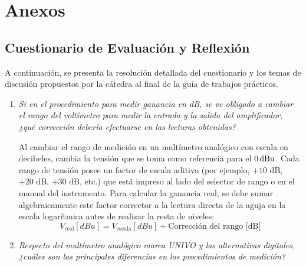 \chapter{Anexos}
\label{chap:anexos}

\section{Cuestionario de Evaluación y Reflexión}

A continuación, se presenta la resolución detallada del cuestionario y los temas de discusión propuestos por la cátedra al final de la guía de trabajos prácticos.

\begin{enumerate}[label=\alph*)]
    \item \textit{Si en el procedimiento para medir ganancia en dB, se ve obligado a cambiar el rango del voltímetro para medir la entrada y la salida del amplificador, ¿qué corrección debería efectuarse en las lecturas obtenidas?}
    
    Al cambiar el rango de medición en un multímetro analógico con escala en decibeles, cambia la tensión que se toma como referencia para el $0\,\mathrm{dBu}$. Cada rango de tensión posee un factor de escala aditivo (por ejemplo, $+10\text{ dB}$, $+20\text{ dB}$, $+30\text{ dB}$, etc.) que está impreso al lado del selector de rango o en el manual del instrumento.
    Para calcular la ganancia real, se debe sumar algebraicamente este factor corrector a la lectura directa de la aguja en la escala logarítmica antes de realizar la resta de niveles:
    \begin{equation}
        V_{\text{real}} [dBu] = V_{\text{escala}} [dBu] + \text{Corrección del rango [dB]}
    \end{equation}
    
    \item \textit{Respecto del multímetro analógico marca UNIVO y las alternativas digitales, ¿cuáles son las principales diferencias en los procedimientos de medición?}
    

\end{enumerate}
